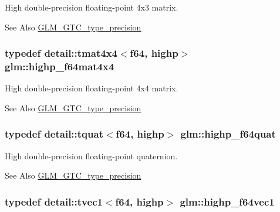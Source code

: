 High double-\/precision floating-\/point 4x3 matrix. \begin{DoxySeeAlso}{See Also}
\hyperlink{group__gtc__type__precision}{G\-L\-M\-\_\-\-G\-T\-C\-\_\-type\-\_\-precision} 
\end{DoxySeeAlso}
\hypertarget{group__gtc__type__precision_gaa95b52552df369b75d09155ebb29b1bd}{
\subsubsection[{highp\-\_\-f64mat4x4}]{\setlength{\rightskip}{0pt plus 5cm}typedef detail\-::tmat4x4$<$f64, highp$>$ {\bf glm\-::highp\-\_\-f64mat4x4}}}\label{group__gtc__type__precision_gaa95b52552df369b75d09155ebb29b1bd}
High double-\/precision floating-\/point 4x4 matrix. \begin{DoxySeeAlso}{See Also}
\hyperlink{group__gtc__type__precision}{G\-L\-M\-\_\-\-G\-T\-C\-\_\-type\-\_\-precision} 
\end{DoxySeeAlso}
\hypertarget{group__gtc__type__precision_ga9372e8b60f401fd94aba637b3ed17cfc}{
\subsubsection[{highp\-\_\-f64quat}]{\setlength{\rightskip}{0pt plus 5cm}typedef detail\-::tquat$<$f64, highp$>$ {\bf glm\-::highp\-\_\-f64quat}}}\label{group__gtc__type__precision_ga9372e8b60f401fd94aba637b3ed17cfc}
High double-\/precision floating-\/point quaternion. \begin{DoxySeeAlso}{See Also}
\hyperlink{group__gtc__type__precision}{G\-L\-M\-\_\-\-G\-T\-C\-\_\-type\-\_\-precision} 
\end{DoxySeeAlso}
\hypertarget{group__gtc__type__precision_ga1054b4e4da2b907b35e1806bd6fbaef1}{
\subsubsection[{highp\-\_\-f64vec1}]{\setlength{\rightskip}{0pt plus 5cm}typedef detail\-::tvec1$<$f64, highp$>$ {\bf glm\-::highp\-\_\-f64vec1}}}\label{group__gtc__type__precision_ga1054b4e4da2b907b35e1806bd6fbaef1}
